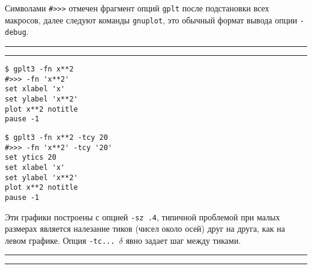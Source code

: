 \documentclass[12pt]{article}
\def\gplt{{\tt gplt}}
\def\gnuplot{{\tt gnuplot}}
\begin{document}
Символами \verb'#>>>' отмечен фрагмент опций \gplt{} после подстановки всех макросов, далее следуют команды \gnuplot,
это обычный формат вывода опции \verb'-debug'.\\

\noindent\rule{.45\textwidth}{1pt}\hfill \raisebox{-.45\height}{\bf № 1.}  \hfill\rule{.45\textwidth}{1pt}

\vspace{3mm}
\noindent
\begin{minipage}[b]{0.19\textwidth}\small
\begin{verbatim}
$ gplt3 -fn x**2 
#>>> -fn 'x**2'
set xlabel 'x'
set ylabel 'x**2'
plot x**2 notitle   
pause -1
\end{verbatim}
\end{minipage}
\hfill
\begin{minipage}[b]{0.27\textwidth}\small
\begin{verbatim}
$ gplt3 -fn x**2 -tcy 20
#>>> -fn 'x**2' -tcy '20'
set ytics 20
set xlabel 'x'
set ylabel 'x**2'
plot x**2 notitle   
pause -1
\end{verbatim}
\end{minipage}

\vspace{3mm} 

Эти графики построены с опцией \verb'-sz .4', типичной проблемой при малых размерах является налезание тиков (чисел около осей) друг на друга, как на левом графике.
Опция \verb'-tc... '$\delta$ явно задает шаг между тиками.\\


\noindent\rule{.45\textwidth}{1pt}\hfill \raisebox{-.45\height}{\bf № 2.}  \hfill\rule{.45\textwidth}{1pt}
\end{document}
